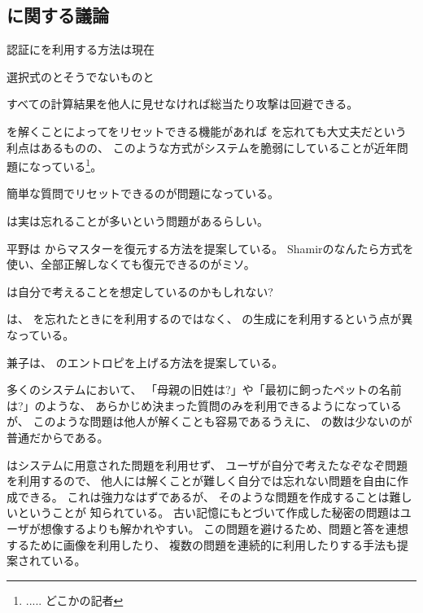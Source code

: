 \documentclass[twoside]{wiss}
\begin{document}
\subsection{{\SQ}に関する議論}


認証に{\SQ}を利用する方法は現在

選択式のとそうでないものと

すべての計算結果を他人に見せなければ総当たり攻撃は回避できる。

{\SQ}を解くことによって{\PW}をリセットできる機能があれば
{\PW}を忘れても大丈夫だという利点はあるものの、
このような方式がシステムを脆弱にしていることが近年問題になっている\footnote{
  ..... どこかの記者
}。

簡単な質問でリセットできるのが問題になっている。

{\SQ}は実は忘れることが多いという問題があるらしい。

平野\cite{平野亮:2011-11-07}は
{\SQ}からマスター{\PW}を復元する方法を提案している。
Shamirのなんたら方式を使い、全部正解しなくても復元できるのがミソ。

{\PW}は自分で考えることを想定しているのかもしれない?


{\EP}は、
{\PW}を忘れたときに{\SQ}を利用するのではなく、
{\PW}の生成に{\SQ}を利用するという点が異なっている。

兼子は、
{\SQ}のエントロピを上げる方法を提案している\cite{Kaneko}。

多くのシステムにおいて、
「母親の旧姓は?」や「最初に飼ったペットの名前は?」のような、
あらかじめ決まった質問のみを利用できるようになっているが、
このような問題は他人が解くことも容易であるうえに、
{\SQ}の数は少ないのが普通だからである\cite{Rabkin:2008:PKQ:1408664.1408667}。

{\EP}はシステムに用意された問題を利用せず、
ユーザが自分で考えたなぞなぞ問題を利用するので、
他人には解くことが難しく自分では忘れない問題を自由に作成できる。
これは強力なはずであるが、
そのような問題を作成することは難しいということが
知られている\cite{Just:2009:PCC:1572532.1572543}\cite{Schechter:2009:NSM:1607723.1608145}。
%
%
%
古い記憶にもとづいて作成した秘密の問題はユーザが想像するよりも解かれやすい。
この問題を避けるため、問題と答を連想するために画像を利用したり、
複数の問題を連続的に利用したりする手法も提案されている\cite{Renaud:2010:PQE:2146303.2146318}。
\end{document}

